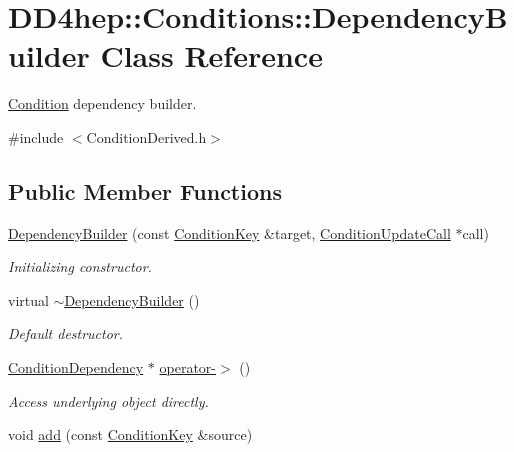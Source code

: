 \hypertarget{class_d_d4hep_1_1_conditions_1_1_dependency_builder}{
\section{DD4hep::Conditions::DependencyBuilder Class Reference}
\label{class_d_d4hep_1_1_conditions_1_1_dependency_builder}
}


\hyperlink{class_d_d4hep_1_1_conditions_1_1_condition}{Condition} dependency builder.  


{\ttfamily \#include $<$ConditionDerived.h$>$}\subsection*{Public Member Functions}
\begin{DoxyCompactItemize}
\item 
\hyperlink{class_d_d4hep_1_1_conditions_1_1_dependency_builder_a3587f9592bbecbbf5594e9953a67eea1}{DependencyBuilder} (const \hyperlink{class_d_d4hep_1_1_conditions_1_1_condition_key}{ConditionKey} \&target, \hyperlink{class_d_d4hep_1_1_conditions_1_1_condition_update_call}{ConditionUpdateCall} $\ast$call)
\begin{DoxyCompactList}\small\item\em Initializing constructor. \item\end{DoxyCompactList}\item 
virtual \hyperlink{class_d_d4hep_1_1_conditions_1_1_dependency_builder_a133550ebf6fef71c365258c1034a4957}{$\sim$DependencyBuilder} ()
\begin{DoxyCompactList}\small\item\em Default destructor. \item\end{DoxyCompactList}\item 
\hyperlink{class_d_d4hep_1_1_conditions_1_1_condition_dependency}{ConditionDependency} $\ast$ \hyperlink{class_d_d4hep_1_1_conditions_1_1_dependency_builder_a250f7140327ba7e4e7344b47313ad0b5}{operator-\/$>$} ()
\begin{DoxyCompactList}\small\item\em Access underlying object directly. \item\end{DoxyCompactList}\item 
void \hyperlink{class_d_d4hep_1_1_conditions_1_1_dependency_builder_afbfb0aa5a9cd8a969588d705cca795e5}{add} (const \hyperlink{class_d_d4hep_1_1_conditions_1_1_condition_key}{ConditionKey} \&source)

\end{DoxyCompactItemize}
